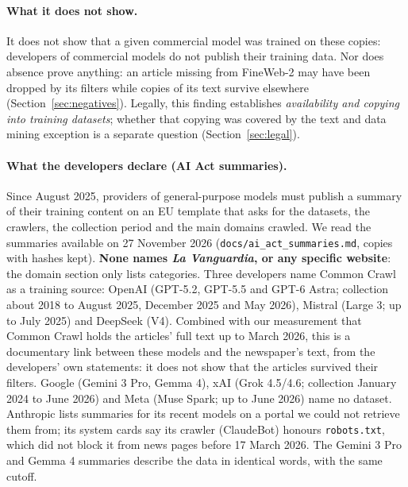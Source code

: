 \documentclass[10pt,a4paper]{article}
\begin{document}
\paragraph{What it does not show.} It does not show that a given commercial model was trained on these copies:
developers of commercial models do not publish their training data. Nor does absence prove anything: an article
missing from FineWeb-2 may have been dropped by its filters while copies of its text survive elsewhere
(Section~\ref{sec:negatives}). Legally, this finding establishes \emph{availability and copying into training
datasets}; whether that copying was covered by the text and data mining exception is a separate question
(Section~\ref{sec:legal}).

\paragraph{What the developers declare (AI Act summaries).} Since August 2025, providers of general-purpose models
must publish a summary of their training content on an EU template that asks for the datasets, the crawlers, the
collection period and the main domains crawled. We read the summaries available on 27 November 2026
(\texttt{docs/ai\_act\_summaries.md}, copies with hashes kept). \textbf{None names \emph{La Vanguardia}, or any
specific website}: the domain section only lists categories. Three developers name Common Crawl as a training source:
OpenAI (GPT-5.2, GPT-5.5 and GPT-6 Astra; collection about 2018 to August 2025, December 2025 and May 2026), Mistral
(Large 3; up to July 2025) and DeepSeek (V4). Combined with our measurement that Common Crawl holds the articles'
full text up to March 2026, this is a documentary link between these models and the newspaper's text, from the
developers' own statements: it does not show that the articles survived their filters. Google (Gemini 3 Pro, Gemma
4), xAI (Grok 4.5/4.6; collection January 2024 to June 2026) and Meta (Muse Spark; up to June 2026) name no dataset.
Anthropic lists summaries for its recent models on a portal we could not retrieve them from; its system cards say
its crawler (ClaudeBot) honours \texttt{robots.txt}, which did not block it from news pages before 17 March 2026.
The Gemini 3 Pro and Gemma 4 summaries describe the data in identical words, with the same cutoff.
\end{document}
